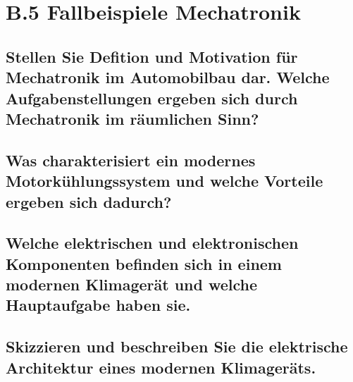 \section*{B.5 Fallbeispiele Mechatronik}

\subsection{Stellen Sie Defition und Motivation f\"ur Mechatronik im Automobilbau dar. Welche Aufgabenstellungen ergeben sich durch Mechatronik im r\"aumlichen Sinn?}

\subsection{Was charakterisiert ein modernes Motork\"uhlungssystem und welche Vorteile ergeben sich dadurch?}

\subsection{Welche elektrischen und elektronischen Komponenten befinden sich in einem modernen Klimager\"at und welche Hauptaufgabe haben sie.}

\subsection{Skizzieren und beschreiben Sie die elektrische Architektur eines modernen Klimager\"ats.}
